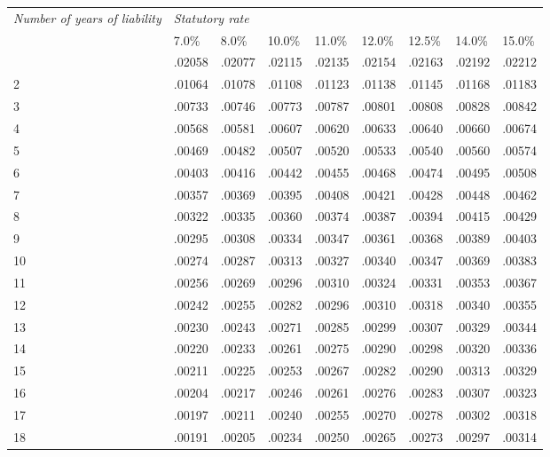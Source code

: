 \documentclass[12pt,a4paper]{article}
\begin{document}
{\footnotesize
\noindent
\begin{longtable}{p{62pt} llll llll}
\hline
\itshape \sloppy Number of years of liability&\multicolumn{7}{l}{\itshape Statutory rate}\\
&7$.$0\%& 8$.$0\%&10$.$0\%&11$.$0\%&12$.$0\%&12$.$5\%&14$.$0\%&15$.$0\%\\
\hline
\endhead
\hline
\endlastfoot
1&$.$02058&$.$02077&$.$02115&$.$02135&$.$02154&$.$02163&$.$02192&$.$02212\\
2&$.$01064&$.$01078&$.$01108&$.$01123&$.$01138&$.$01145&$.$01168&$.$01183\\
3&$.$00733&$.$00746&$.$00773&$.$00787&$.$00801&$.$00808&$.$00828&$.$00842\\	
4&$.$00568&$.$00581&$.$00607&$.$00620&$.$00633&$.$00640&$.$00660&$.$00674\\
5&$.$00469&$.$00482&$.$00507&$.$00520&$.$00533&$.$00540&$.$00560&$.$00574\\
6&$.$00403&$.$00416&$.$00442&$.$00455&$.$00468&$.$00474&$.$00495&$.$00508\\
7&$.$00357&$.$00369&$.$00395&$.$00408&$.$00421&$.$00428&$.$00448&$.$00462\\
8&$.$00322&$.$00335&$.$00360&$.$00374&$.$00387&$.$00394&$.$00415&$.$00429\\
9&$.$00295&$.$00308&$.$00334&$.$00347&$.$00361&$.$00368&$.$00389&$.$00403\\
10&$.$00274&$.$00287&$.$00313&$.$00327&$.$00340&$.$00347&$.$00369&$.$00383\\
11&$.$00256&$.$00269&$.$00296&$.$00310&$.$00324&$.$00331&$.$00353&$.$00367\\
12&$.$00242&$.$00255&$.$00282&$.$00296&$.$00310&$.$00318&$.$00340&$.$00355\\
13&$.$00230&$.$00243&$.$00271&$.$00285&$.$00299&$.$00307&$.$00329&$.$00344\\
14&$.$00220&$.$00233&$.$00261&$.$00275&$.$00290&$.$00298&$.$00320&$.$00336\\
15&$.$00211&$.$00225&$.$00253&$.$00267&$.$00282&$.$00290&$.$00313&$.$00329\\
16&$.$00204&$.$00217&$.$00246&$.$00261&$.$00276&$.$00283&$.$00307&$.$00323\\
17&$.$00197&$.$00211&$.$00240&$.$00255&$.$00270&$.$00278&$.$00302&$.$00318\\
18&$.$00191&$.$00205&$.$00234&$.$00250&$.$00265&$.$00273&$.$00297&$.$00314\\
\end{longtable}

}
\end{document}
